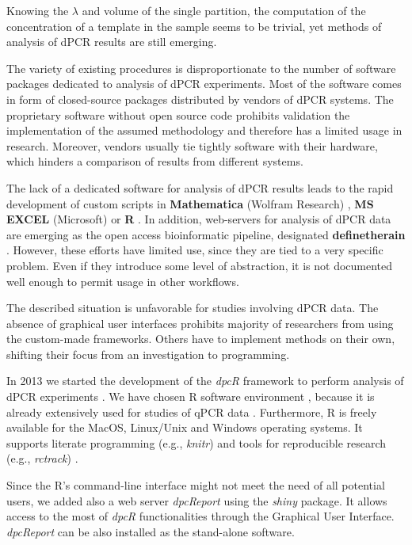 \documentclass[a4,center,fleqn]{NAR}
\begin{document}
Knowing the $\lambda$ and volume of the single partition, the computation of 
the concentration of a template in the sample seems to be trivial, yet methods 
of analysis of dPCR results are still emerging.

The variety of existing procedures is disproportionate to the number of 
software packages dedicated to analysis of dPCR experiments. Most of the 
software comes in form of closed-source packages distributed by vendors of dPCR 
systems. The proprietary software without open source code prohibits validation 
the implementation of the assumed methodology and therefore has a limited usage 
in research. Moreover, vendors usually tie tightly software with their 
hardware, which hinders a comparison of results from different systems.

The lack of a dedicated software for analysis of dPCR results leads to the rapid 
development of custom scripts in \textbf{Mathematica} (Wolfram Research) 
\cite{strain_highly_2013}, \textbf{MS EXCEL} (Microsoft) 
\cite{dobnik_multiplex_2015} or \textbf{R} \cite{trypsteen_ddpcrquant_2015, 
dreo_optimising_2014}. In addition, web-servers for analysis of dPCR data are 
emerging as the open access bioinformatic pipeline, designated 
\textbf{definetherain} \cite{jones_low_2014}. However, these efforts have 
limited use, since they are tied to a very specific problem. Even if they 
introduce some level of abstraction, it is not documented well enough to 
permit usage in other workflows.

The described situation is unfavorable for studies involving dPCR data. The 
absence of graphical user interfaces prohibits majority of researchers from 
using the custom-made frameworks. Others have to implement methods on their own, 
shifting their focus from an investigation to programming. 

In 2013 we started the development of the \textit{dpcR} framework to perform 
analysis of dPCR experiments \cite{burdukiewicz_dpcr:_2013}. We have chosen R 
software environment \cite{Rcitation}, because it is already extensively used 
for studies of qPCR data \cite{ritz_qpcr_2008, rodiger_r_2015}. Furthermore, R 
is freely available for the MacOS, Linux/Unix and Windows operating systems. It 
supports literate programming (e.g., \textit{knitr}) and tools for reproducible 
research (e.g., \textit{rctrack}) \cite{liu_r_2014}. 

Since the R's command-line interface might not meet the need of all potential 
users, we added also a web server \textit{dpcReport} using the \textit{shiny} 
package. It allows access to the most of \textit{dpcR} functionalities through 
the Graphical User Interface. \textit{dpcReport} can be also installed as the 
stand-alone software.
\end{document}
